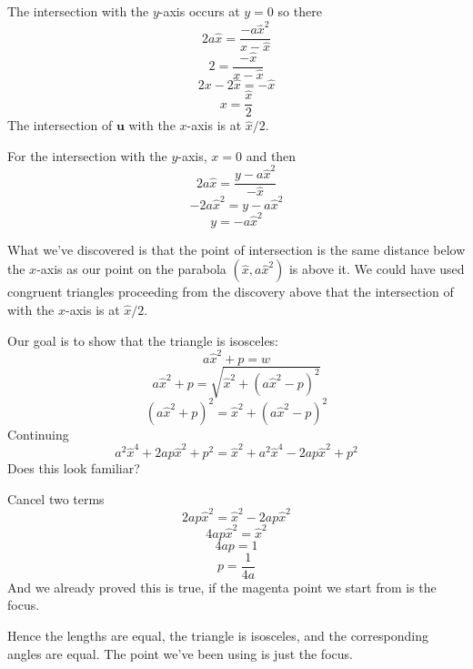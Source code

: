 \documentclass[11pt, oneside]{article}
\begin{document}
The intersection with the $y$-axis occurs at $y = 0$ so there
\[ 2a \hat{x} = \frac{- a \hat{x}^2}{x - \hat{x}} \]
\[ 2 = \frac{- \hat{x}}{x - \hat{x}} \]
\[ 2x - 2 \hat{x} = - \hat{x} \]
\[ x = \frac{\hat{x}}{2} \]
The intersection of $\mathbf{u}$ with the $x$-axis is at $\hat{x}/2$.

For the intersection with the $y$-axis, $x = 0$ and then
\[ 2a \hat{x} = \frac{y - a \hat{x}^2}{- \hat{x}} \]
\[ -2a \hat{x}^2 = y - a \hat{x}^2 \]
\[ y = - a \hat{x}^2 \]

What we've discovered is that the point of intersection is the same distance below the $x$-axis as our point on the parabola $(\hat{x}, a\hat{x}^2)$ is above it.  We could have used congruent triangles proceeding from the discovery above that the intersection of with the $x$-axis is at $\hat{x}/2$.

Our goal is to show that the triangle is isosceles:
\[ a\hat{x}^2 + p = w \]
\[ a\hat{x}^2 + p = \sqrt{\hat{x}^2 + (a\hat{x}^2 - p)^2} \]
\[ (a\hat{x}^2 + p)^2 = \hat{x}^2 + (a\hat{x}^2 - p)^2 \]
Continuing
\[ a^2 \hat{x}^4 + 2ap \hat{x}^2 + p^2 = \hat{x}^2 + a^2 \hat{x}^4 - 2ap \hat{x}^2 + p^2 \]
Does this look familiar?

Cancel two terms
\[ 2ap \hat{x}^2 = \hat{x}^2  - 2ap \hat{x}^2 \]
\[ 4ap\hat{x}^2 = \hat{x}^2 \]
\[ 4ap = 1 \]
\[ p = \frac{1}{4a} \]
And we already proved this is true, if the magenta point we start from is the focus.

Hence the lengths are equal, the triangle is isosceles, and the corresponding angles are equal.  The point we've been using is just the focus.
\end{document}
